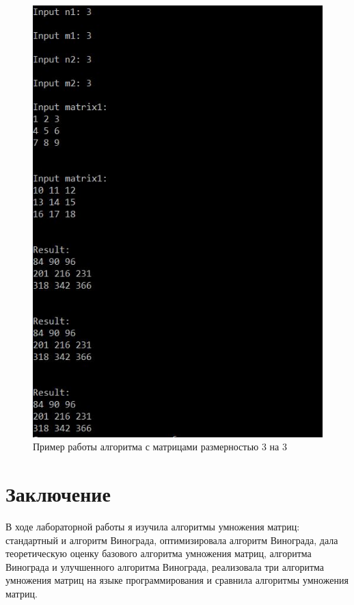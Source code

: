 \documentclass[12pt]{report}
\begin{document}
\begin{figure}[h]
\centering
\includegraphics[width=1\linewidth]{matrix33.jpg}
\caption{Пример работы алгоритма с матрицами размерностью 3 на 3}
\label{fig:mpr}
\end{figure}





\chapter*{Заключение}
В ходе лабораторной работы я изучила алгоритмы умножения матриц: стандартный и алгоритм Винограда, оптимизировала алгоритм Винограда, дала теоретическую оценку базового алгоритма умножения матриц, алгоритма Винограда и улучшенного алгоритма Винограда, реализовала три алгоритма умножения матриц на языке программирования и сравнила алгоритмы умножения матриц.
\end{document}
